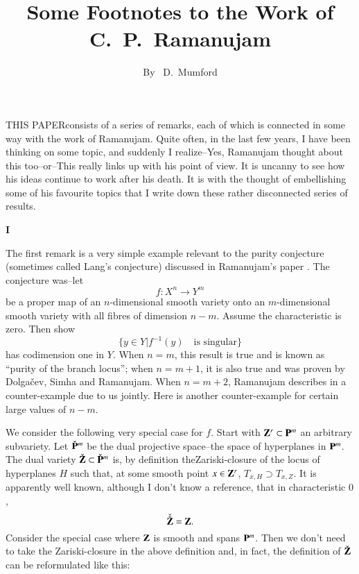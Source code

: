 \title{Some Footnotes to the Work of C.~P.~Ramanujam}\label{art01}

\author{By~ D.~Mumford}

\date{}
\maketitle

\setcounter{page}{289}

\setcounter{pageoriginal}{246}
THIS PAPER\pageoriginale consists of a series of remarks, each of which is
connected in some way with the work of Ramanujam. Quite often,  in the
last few years, I have been thinking on some topic, and suddenly I
realize--Yes, Ramanujam thought about this too--or--This really links
up with his point of view. It is uncanny to see how his ideas continue
to work after his death. It is with the thought of embellishing some
of his favourite topics that I write down these rather disconnected
series of results.

\bigskip

\begin{center}
{\large\bf I}
\end{center}
\smallskip

The first remark is a very simple example relevant to the purity
conjecture (sometimes called Lang's conjecture) discussed in
Ramanujam's paper \cite{art01-key10}. The conjecture was--let
$$
f:X^{n}\to Y^{m}
$$
be a proper map of an $n$-dimensional smooth variety onto an
$m$-dimen\-sional smooth variety with all fibres of dimension
$n-m$. Assume the characteristic is zero. Then show
$$
\{y\in Y|f^{-1}(y)\quad\text{is singular}\}
$$
has codimension one in $Y$. When $n=m$, this result is true and is
known as ``purity of the branch locus''; when $n=m+1$, it is also true
and was proven by Dolga\v{c}ev, Simha and Ramanujam. When $n=m+2$,
Ramanujam describes in \cite{art01-key10} a counter-example due to us
jointly. Here is another counter-example for certain large values of
$n-m$. 

We consider the following very special case for $f$. Start with
$\mathbf{Z}^{r}\subset \mathbf{P}^{m}$ an arbitrary subvariety. Let
$\check{\mathbf{P}}^{m}$ be the dual projective space--the space of
hyperplanes in $\mathbf{P}^{m}$. The dual variety
$\check{\mathbf{Z}}\subset \check{\mathbf{P}}^{m}$ is, by definition
the\pageoriginale Zariski-closure of the locus of hyperplanes $H$ such
that, at some smooth point $x\in \mathbf{Z}^{r}$, $T_{x,H}\supset T_{x,Z}$. It
is apparently well known, although I don't know a reference, that in
characteristic $0$,
$$
\check{\check{\mathbf{Z}}}=\mathbf{Z}.
$$
Consider the special case where $\mathbf{Z}$ is smooth and spans
$\mathbf{P}^{m}$. Then we don't need to take the Zariski-closure in the
above definition and, in fact, the definition of $\check{\mathbf{Z}}$ can be
reformulated like this:

